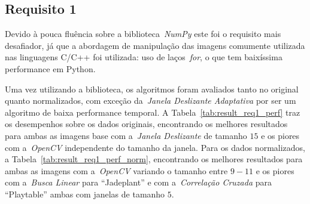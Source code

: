 \subsection{Requisito 1}
    \label{subsec:result_req1}
Devido à pouca fluência sobre a biblioteca~\emph{NumPy} este foi o requisito mais desafiador, já que a abordagem de manipulação das imagens comumente utilizada nas linguagens C/C++ foi utilizada: uso de laços~\emph{for}, o que tem baixíssima performance em Python.

Uma vez utilizando a biblioteca, os algoritmos foram avaliados tanto no original quanto normalizados, com exceção da~\emph{Janela Deslizante Adaptativa} por ser um algoritmo de baixa performance temporal. A Tabela~\ref{tab:result_req1_perf} traz os desempenhos sobre os dados originais, encontrando os melhores resultados para ambas as imagens base com a~\emph{Janela Deslizante} de tamanho $15$ e os piores com a~\emph{OpenCV} independente do tamanho da janela. Para os dados normalizados, a Tabela~\ref{tab:result_req1_perf_norm}, encontrando os melhores resultados para ambas as imagens com a~\emph{OpenCV} variando o tamanho entre $9-11$ e os piores com a~\emph{Busca Linear} para ``Jadeplant'' e com a~\emph{Correlação Cruzada} para ``Playtable'' ambas com janelas de tamanho $5$.

